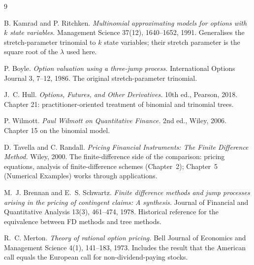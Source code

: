 \documentclass[11pt,a4paper]{article}
\begin{document}
\begin{thebibliography}{9}

B. Kamrad and P. Ritchken.
\emph{Multinomial approximating models for options with $k$ state variables.}
Management Science 37(12), 1640--1652, 1991. Generalises the
stretch-parameter trinomial to $k$ state variables; their stretch
parameter is the square root of the $\lambda$ used here.

P. Boyle.
\emph{Option valuation using a three-jump process.}
International Options Journal 3, 7--12, 1986. The original
stretch-parameter trinomial.

J.~C. Hull.
\emph{Options, Futures, and Other Derivatives.}
10th ed., Pearson, 2018. Chapter 21: practitioner-oriented treatment
of binomial and trinomial trees.

P. Wilmott.
\emph{Paul Wilmott on Quantitative Finance.}
2nd ed., Wiley, 2006. Chapter 15 on the binomial model.

D. Tavella and C. Randall.
\emph{Pricing Financial Instruments: The Finite Difference Method.}
Wiley, 2000. The finite-difference side of the comparison: pricing
equations, analysis of finite-difference schemes (Chapter~2);
Chapter~5 (Numerical Examples) works through applications.

M.~J. Brennan and E.~S. Schwartz.
\emph{Finite difference methods and jump processes arising in the
pricing of contingent claims: A synthesis.}
Journal of Financial and Quantitative Analysis 13(3), 461--474, 1978.
Historical reference for the equivalence between FD methods and
tree methods.

R.~C. Merton.
\emph{Theory of rational option pricing.}
Bell Journal of Economics and Management Science 4(1), 141--183, 1973.
Includes the result that the American call equals the European call
for non-dividend-paying stocks.

\end{thebibliography}
\end{document}
